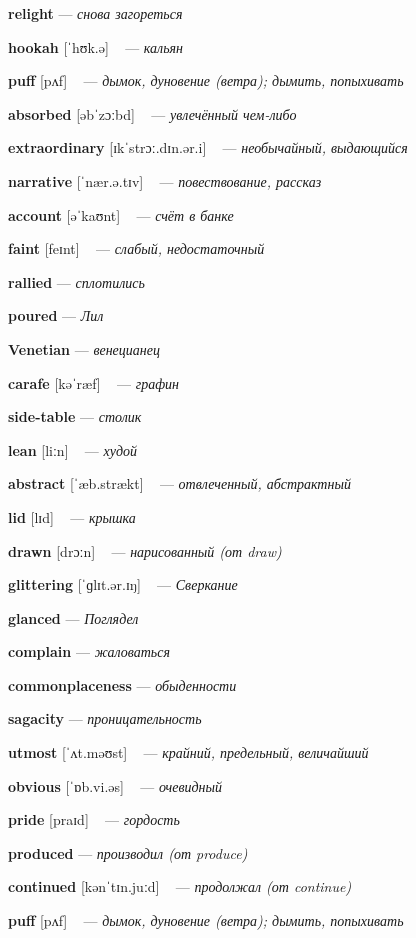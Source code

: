 \documentclass[a4paper,oneside,12pt]{amsart}
\begin{document}
{\large 

 {\bf relight } --- \emph{ снова загореться }

{\bf hookah } [ˈhʊk.ə] ~ --- \emph{ кальян }

{\bf puff } [pʌf] ~ --- \emph{ дымок, дуновение (ветра); дымить, попыхивать }

{\bf absorbed } [əbˈzɔːbd] ~ --- \emph{ увлечённый чем-либо }

{\bf extraordinary } [ɪkˈstrɔː.dɪn.ər.i] ~ --- \emph{ необычайный, выдающийся }

{\bf narrative } [ˈnær.ə.tɪv] ~ --- \emph{ повествование, рассказ }

{\bf account } [əˈkaʊnt] ~ --- \emph{ счёт в банке }

{\bf faint } [feɪnt] ~ --- \emph{ слабый, недостаточный }

{\bf rallied } --- \emph{ сплотились }

{\bf poured } --- \emph{ Лил }

{\bf Venetian } --- \emph{ венецианец }

{\bf carafe } [kəˈræf] ~ --- \emph{ графин }

{\bf side-table } --- \emph{ столик }

{\bf lean } [liːn] ~ --- \emph{ худой }

{\bf abstract } [ˈæb.strækt] ~ --- \emph{ отвлеченный, абстрактный }

{\bf lid } [lɪd] ~ --- \emph{ крышка }

{\bf drawn } [drɔːn] ~ --- \emph{ нарисованный (от draw) }

{\bf glittering } [ˈɡlɪt.ər.ɪŋ] ~ --- \emph{ Сверкание }

{\bf glanced } --- \emph{ Поглядел }

{\bf complain } --- \emph{ жаловаться }

{\bf commonplaceness } --- \emph{ обыденности }

{\bf sagacity } --- \emph{ проницательность }

{\bf utmost } [ˈʌt.məʊst] ~ --- \emph{ крайний, предельный, величайший }

{\bf obvious } [ˈɒb.vi.əs] ~ --- \emph{ очевидный }

{\bf pride } [praɪd] ~ --- \emph{ гордость }

{\bf produced } --- \emph{ производил (от produce) }

{\bf continued } [kənˈtɪn.juːd] ~ --- \emph{ продолжал (от continue) }

{\bf puff } [pʌf] ~ --- \emph{ дымок, дуновение (ветра); дымить, попыхивать }

}
\end{document}

